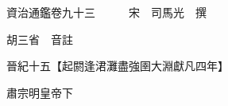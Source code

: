 










 


 
 


 

  
  
  
  
  





  
  
  
  
  
 
  

  

  
  
  



  

 
 

  
   




  

  
  


  　　資治通鑑卷九十三　　　宋　司馬光　撰

　　胡三省　音註

　　晉紀十五【起閼逢涒灘盡強圉大淵獻凡四年】

　　肅宗明皇帝下

